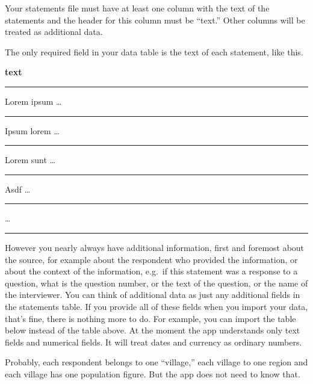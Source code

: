 \documentclass[
]{book}
\begin{document}
Your statements file must have at least one column with the text of the statements and the header for this column must be ``text.'' Other columns will be treated as additional data.

The only required field in your data table is the text of each statement, like this.

\textbf{text}

\begin{center}\rule{0.5\linewidth}{0.5pt}\end{center}

Lorem ipsum \ldots{}

\begin{center}\rule{0.5\linewidth}{0.5pt}\end{center}

Ipsum lorem \ldots{}

\begin{center}\rule{0.5\linewidth}{0.5pt}\end{center}

Lorem sunt \ldots{}

\begin{center}\rule{0.5\linewidth}{0.5pt}\end{center}

Asdf \ldots{}

\begin{center}\rule{0.5\linewidth}{0.5pt}\end{center}

\ldots{}

\begin{center}\rule{0.5\linewidth}{0.5pt}\end{center}

However you nearly always have additional information, first and foremost about the source, for example about the respondent who provided the information, or about the context of the information, e.g.~if this statement was a response to a question, what is the question number, or the text of the question, or the name of the interviewer. You can think of additional data as just any additional fields in the statements table. If you provide all of these fields when you import your data, that's fine, there is nothing more to do. For example, you can import the table below instead of the table above. At the moment the app understands only text fields and numerical fields. It will treat dates and currency as ordinary numbers.

Probably, each respondent belongs to one ``village,'' each village to one region and each village has one population figure. But the app does not need to know that.
\end{document}
